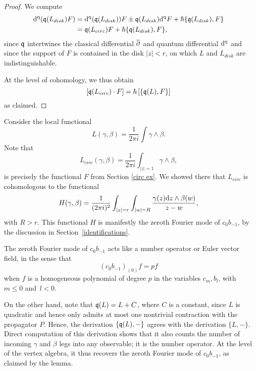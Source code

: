 \begin{proof}
We compute
\begin{align*}
{\rm d}^{\rm q}(\frak{q}(L_{disk}) F) &= {\rm d}^{\rm q}(\frak{q}(L_{disk})) F \pm \frak{q}(L_{disk}) {\rm d}^{\rm q} F+ \hbar \{\frak{q}(L_{disk}),F\} \\
&=\frak{q}(L_{circ})F +\hbar \{\frak{q}(L_{disk}),F\},
\end{align*}
since $\frak{q}$ intertwines the classical differential $\overline{\partial} $ and quantum differential ${\rm d}^{\rm q}$ and
since the support of $F$ is contained in the disk $|z| < r$, 
on which $L$ and $L_{disk}$ are indistinguishable.

At the level of cohomology, we thus obtain
\[
[\frak{q}(L_{circ}) \cdot F] =\hbar \left[ \{\frak{q}(L) , F\} \right] 
\]
as claimed.
\end{proof}

\begin{ex} Consider the local functional
\[
L(\gamma,\beta) = \frac{1}{2\pi i}\int \gamma \wedge \beta. 
\]
Note that
\[
L_{circ} (\gamma,\beta) = \frac{1}{2\pi i}\int_{|z|=1} \gamma \wedge \beta,
\]
is precisely the functional $F$ from Section \ref{circ ex}.
We showed there that $L_{circ}$ is cohomologous to the functional
\[
H(\gamma,\beta) = \frac{1}{(2\pi i)^2} \int_{|z| = r} \int_{|w| = R} \frac{\gamma(z) {\rm d} z \wedge \beta(w)}{z-w},
\]
with $R > r$.
This functional $H$ is manifestly the zeroth Fourier mode of $c_0 b_{-1}$,
by the discussion in Section~\ref{identifications}.

The zeroth Fourier mode of $c_0 b_{-1}$ acts like a number operator or Euler vector field, in the sense that 
\[
(c_0 b_{-1})_{(0)} f = p f 
\]
when $f$ is a homogeneous polynomial of degree $p$ in the variables $c_{m},b_{l}$, with $m \leq 0$ and~$l < 0$.


On the other hand, note that $\frak{q}(L) = L + C$, where $C$ is a constant, since $L$ is quadratic and hence only admits at most one nontrivial contraction with the propagator $P$. Hence, the derivation $\{\frak{q}(L), -\}$ agrees with the derivation $\{L, -\}$.
Direct computation of this derivation shows that it also counts the number of incoming $\gamma$ and $\beta$ legs into any observable; it is the number operator. At the level of the vertex algebra, it thus recovers the zeroth Fourier mode of $c_0 b_{-1}$,
as claimed by the lemma.
\end{ex}


